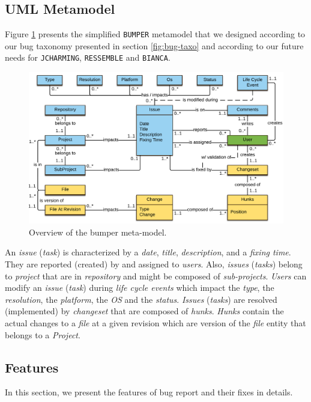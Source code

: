 \subsection{UML Metamodel}

Figure \ref{fig:bumper-approach} presents the simplified {\tt BUMPER} metamodel that we designed according to our bug taxonomy presented in section \ref{fig:bug-taxo} and according to our future needs for {\tt JCHARMING}, {\tt RESSEMBLE} and {\tt BIANCA}.

\begin{figure}[h!]
  \centering
    \includegraphics{media/bumper-model.png}
    \caption{Overview of the bumper meta-model.
    \label{fig:bumper-approach} }
\end{figure}


An {\it issue} ({\it task}) is characterized by a {\it date}, {\it title}, {\it description}, and a {\it fixing time}. They are reported (created) by and assigned to {\it users}.
Also, {\it issues} ({\it tasks}) belong to {\it project} that are in {\it repository} and might be composed of {\it sub-projects}.
{\it Users} can modify an {\it issue } ({\it task})  during {\it life cycle events} which impact the {\it type}, the {\it resolution}, the {\it platform}, the {\it OS} and the {\it status}. {\it Issues} ({\it tasks}) are resolved (implemented) by {\it changeset} that are composed of {\it hunks}. {\it Hunks} contain the actual changes to a {\it file} at a given revision which are version of the {\it file} entity that belongs to a {\it Project}.


\subsection{Features}

In this section, we present the features of bug report and their fixes in details.

